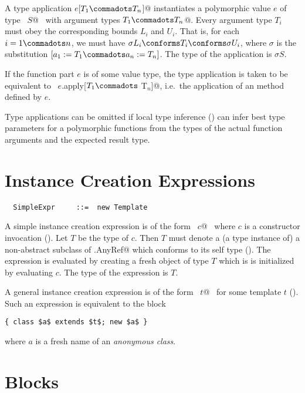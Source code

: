 A type application \lstinline@$e$[$T_1 \commadots T_n$]@ instantiates a
polymorphic value $e$ of type
~\lstinline@[$a_1$ >: $L_1$ <: $U_1 \commadots a_n$ >: $L_n$ <: $U_n$]$S$@~ with
argument types \lstinline@$T_1 \commadots T_n$@.  Every argument type
$T_i$ must obey the corresponding bounds $L_i$ and
$U_i$.  That is, for each $i = 1 \commadots n$, we must
have $\sigma L_i  \conforms T_i \conforms \sigma U_i$, where $\sigma$ is the
substitution $[a_1 := T_1 \commadots a_n := T_n]$.  The type
of the application is $\sigma S$.  

If the function part $e$ is of some value type, the type application
is taken to be equivalent to 
~\lstinline@$e$.apply[$T_1 \commadots$ T$_n$]@, i.e.\ the application of an  method defined by
$e$.

Type applications can be omitted if local type inference
() can infer best type parameters for a
polymorphic functions from the types of the actual function arguments
and the expected result type.

\section{Instance Creation Expressions}
\label{sec:inst-creation}

\syntax\begin{lstlisting}
  SimpleExpr     ::=  new Template
\end{lstlisting}

A simple instance creation expression is of the form ~\lstinline@new $c$@~ 
where $c$ is a constructor invocation
().  Let $T$ be the type of $c$. Then $T$ must
denote a (a type instance of) a non-abstract subclass of
\lstinline@scala.AnyRef@ which conforms to its self type
(). The expression is evaluated by creating a fresh
object of type $T$ which is is initialized by evaluating $c$. The
type of the expression is $T$.

A general instance creation expression is of the form 
~\lstinline@new $t$@~ for some template $t$ ().
Such an expression is equivalent to the block
\begin{lstlisting}
{ class $a$ extends $t$; new $a$ }
\end{lstlisting}
where $a$ is a fresh name of an {\em anonymous class}.

\section{Blocks}
\label{sec:blocks}

